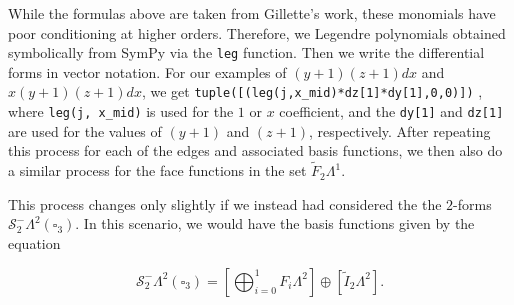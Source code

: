 \documentclass[format=acmsmall,screen,timestamp=false,a4paper]{acmart}
\newcommand{\calS}{\mathcal{S}}
\begin{document}
While the formulas above are taken from Gillette's \cite{gillette2019computational} work, these monomials have poor conditioning at higher orders.
Therefore, we Legendre polynomials obtained symbolically from SymPy via the \texttt{leg} function.  Then we write the differential forms in vector notation.  For our examples of $(y+1)(z+1)dx$ and $x(y+1)(z+1)dx$, we get
\texttt{tuple([(leg(j,x\_mid)*dz[1]*dy[1],0,0)])}
, where \texttt{leg(j, x\_mid)} is used for the $1$ or $x$ coefficient, and the \texttt{dy[1]} and \texttt{dz[1]} are used for the values of $(y+1)$ and $(z+1)$, respectively.  After repeating this process for each of the edges and associated basis functions, we then also do a similar process for the face functions in the set $\tilde{F}_2 \Lambda^1$.  

This process changes only slightly if we instead had considered the the $2$-forms $\mathcal{S}^-_2 \Lambda^2(\square_3)$.  In this scenario, we would have the basis functions given by the equation

\begin{equation*}
\calS^-_2\Lambda^2(\square_3) =    \left[\bigoplus_{i=0}^{1} F_i \Lambda^2\right] \oplus \left[\tilde{I}_2 \Lambda^2\right].
\end{equation*}
\end{document}
